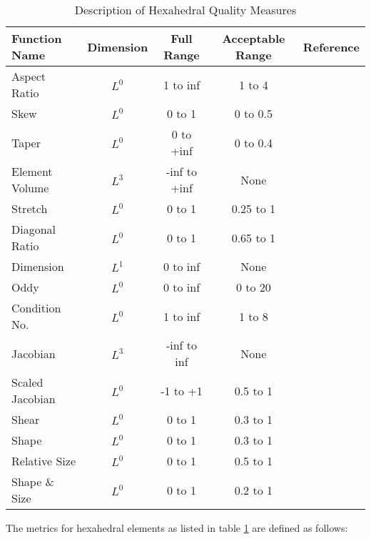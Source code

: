 \documentclass[10pt]{report}
\begin{document}
\begin{appendix}
\begin{table}[h]
\begin{center}
\begin{tabular}{|l|c|c|c|c|}
\hline
Function Name  &  Dimension & Full Range &Acceptable Range &  Reference \\
\hline
Aspect Ratio   &    $L^0$ &    1 to inf  &    1 to 4       & \cite{taylor} \\
Skew           &    $L^0$ &    0 to 1    &    0 to 0.5     & \cite{taylor} \\
Taper          &    $L^0$ &    0 to +inf &    0 to 0.4     & \cite{taylor} \\
Element Volume &    $L^3$ & -inf to +inf &     None        & \cite{taylor} \\
Stretch        &    $L^0$ &    0 to 1    &  0.25 to 1      & \cite{fimesh} \\
Diagonal Ratio &    $L^0$ &    0 to 1    &  0.65 to 1      &            \\
Dimension      &    $L^1$ &    0 to inf  &     None        & \cite{taylor} \\
Oddy           &    $L^0$ &    0 to inf  &    0 to 20      & \cite{oddy}\cite{knupp2000} \\
Condition No.  &    $L^0$ &    1 to inf  &    1 to 8       & \cite{knupp2000} \\
Jacobian       &    $L^3$ & -inf to inf  &     None        & \cite{knupp2000} \\
Scaled Jacobian&    $L^0$ &   -1 to +1   &  0.5 to 1       & \cite{knupp2000} \\
Shear          &    $L^0$ &    0 to 1    &  0.3 to 1       & \cite{knupp2002} \\
Shape          &    $L^0$ &    0 to 1    &  0.3 to 1       & \cite{knupp2002} \\
Relative Size  &    $L^0$ &    0 to 1    &  0.5 to 1       & \cite{knupp2002} \\
Shape \& Size  &    $L^0$ &    0 to 1    &  0.2 to 1       & \cite{knupp2002} \\
\hline
\end{tabular}
\end{center}
\T\caption{Description of Hexahedral Quality Measures}
\label{tab:hex}
\end{table}

The metrics for hexahedral elements as listed in table 
\ref{tab:hex} are defined as follows:
\T\bigskip
\htmlrule


\end{appendix}
\end{document}
